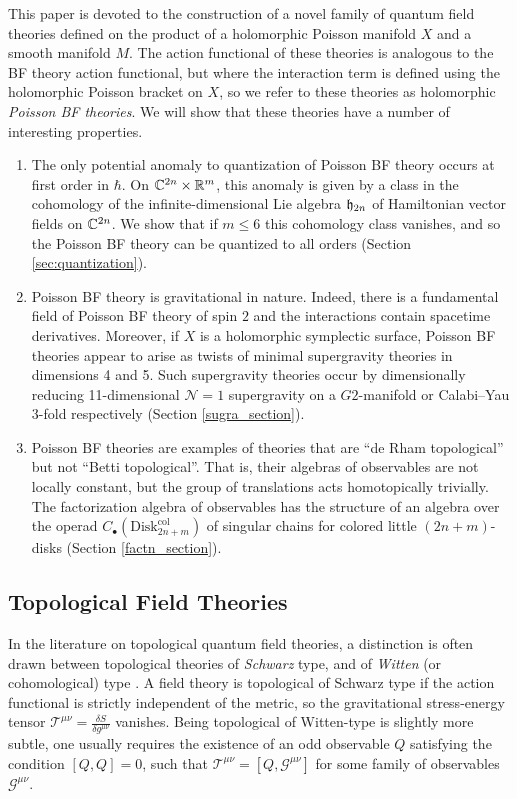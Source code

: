 \documentclass[11pt, oneside, reqno]{amsart}
\theoremstyle{definition} \newtheorem{definition}{Definition}[section]
\theoremstyle{definition}
\theoremstyle{remark}
\theoremstyle{definition} \newtheorem{remark}[definition]{Remark}
\theoremstyle{definition} \newtheorem{remarks}[definition]{Remarks}
\theoremstyle{definition} \newtheorem{question}[definition]{Question}
\theoremstyle{definition} \newtheorem*{note}{Note}
\theoremstyle{definition} \newtheorem{example}[definition]{Example}
\theoremstyle{definition} \newtheorem{examples}[definition]{Examples}
\newcommand{\mr}[1]{\mathrm{#1}}
\newcommand{\mc}[1]{\mathcal{#1}}
\newcommand{\ham}{/\!\!/}
\def\ham{\fh}
\begin{document}
This paper is devoted to the construction of a novel family of quantum field theories defined on the product of a holomorphic Poisson manifold $X$ and a smooth manifold $M$.  The action functional of these theories is analogous to the BF theory action functional, but where the interaction term is defined using the holomorphic Poisson bracket on $X$, so we refer to these theories as holomorphic \emph{Poisson BF theories}.  We will show that these theories have a number of interesting properties.
\begin{enumerate}
 \item The only potential anomaly to quantization of Poisson BF theory occurs at first order in $\hbar$.  
 On $\mathbb C^{2n} \times \mathbb R^m$, this anomaly is given by a class in the cohomology of the infinite-dimensional Lie algebra $\ham_{2n}$ of Hamiltonian vector fields on $\mathbb C^{2n}$.  We show that if $m \le 6$ this cohomology class vanishes, and so the Poisson BF theory can be quantized to all orders (Section \ref{sec:quantization}).
 \item Poisson BF theory is gravitational in nature. 
 Indeed, there is a fundamental field of Poisson BF theory of spin $2$ and the interactions contain spacetime derivatives.
 Moreover, if $X$ is a holomorphic symplectic surface, Poisson BF theories appear to arise as twists of minimal supergravity theories in dimensions 4 and 5.  Such supergravity theories occur by dimensionally reducing 11-dimensional $\mc N=1$ supergravity on a $G2$-manifold or Calabi--Yau 3-fold respectively (Section \ref{sugra_section}).
 \item Poisson BF theories are examples of theories that are ``de Rham topological'' but not ``Betti topological''.  That is, their algebras of observables are not locally constant, but the group of translations acts homotopically trivially.  The factorization algebra of observables has the structure of an algebra over the operad $C_\bullet(\mr{Disk}_{2n+m}^{\mr{col}})$ of singular chains for colored little $(2n+m)$-disks (Section \ref{factn_section}).
\end{enumerate}

\subsection{Topological Field Theories}
In the literature on topological quantum field theories, a distinction is often drawn between topological theories of \emph{Schwarz} type, and of \emph{Witten} (or cohomological) type \cite{SchwarzICM}.  A field theory is topological of Schwarz type if the action functional is strictly independent of the metric, so the gravitational stress-energy tensor $\mc T^{\mu \nu} = \frac{\delta S}{\delta g^{\mu \nu}}$ vanishes.  Being topological of Witten-type is slightly more subtle, one usually requires the existence of an odd observable $Q$ satisfying the condition $[Q,Q] = 0$, such that $\mc T^{\mu \nu} = [Q, \mc G^{\mu \nu}]$ for some family of observables $\mc G^{\mu \nu}$.
\end{document}
